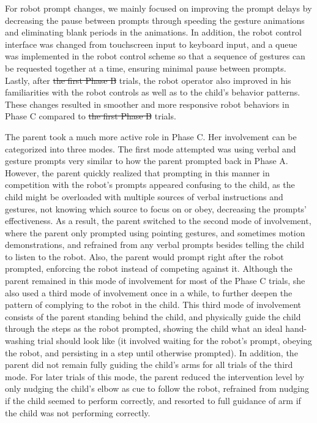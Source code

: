 \documentclass{ut-thesis}
\providecommand{\DIFaddtex}[1]{{\protect\color{blue}\uwave{#1}}} %
\providecommand{\DIFdeltex}[1]{{\protect\color{red}\sout{#1}}}                      %
\providecommand{\DIFaddbegin}{} %
\providecommand{\DIFaddend}{} %
\providecommand{\DIFdelbegin}{} %
\providecommand{\DIFdelend}{} %
\providecommand{\DIFadd}[1]{\texorpdfstring{\DIFaddtex{#1}}{#1}} %
\providecommand{\DIFdel}[1]{\texorpdfstring{\DIFdeltex{#1}}{}} %
\begin{document}
For robot prompt changes, we mainly focused on improving the prompt delays by decreasing the pause between prompts through speeding the gesture animations and eliminating blank periods in the animations.  In addition, the robot control interface was changed from touchscreen input to keyboard input, and a queue was implemented in the robot control scheme so that a sequence of gestures can be requested together at a time, ensuring minimal pause between prompts.  Lastly, after \DIFdelbegin \DIFdel{the first Phase B }\DIFdelend \DIFaddbegin \DIFadd{Phase B1 }\DIFaddend trials, the robot operator also improved in his familiarities with the robot controls as well as to the child's behavior patterns.  These changes resulted in smoother and more responsive robot behaviors in Phase C compared to \DIFdelbegin \DIFdel{the first Phase B }\DIFdelend \DIFaddbegin \DIFadd{Phase B1 }\DIFaddend trials.

The parent took a much more active role in Phase C.  Her involvement can be categorized into three modes.  The first mode attempted was using verbal and gesture prompts very similar to how the parent prompted back in Phase A.  However, the parent quickly realized that prompting in this manner in competition with the robot's prompts appeared confusing to the child, as the child might be overloaded with multiple sources of verbal instructions and gestures, not knowing which source to focus on or obey, decreasing the prompts' effectiveness.  As a result, the parent switched to the second mode of involvement, where the parent only prompted using pointing gestures, and sometimes motion demonstrations, and refrained from any verbal prompts besides telling the child to listen to the robot.  Also, the parent would prompt right after the robot prompted, enforcing the robot instead of competing against it.  Although the parent remained in this mode of involvement for most of the Phase C trials, she also used a third mode of involvement once in a while, to further deepen the pattern of complying to the robot in the child.  This third mode of involvement consists of the parent standing behind the child, and physically guide the child through the steps as the robot prompted, showing the child what an ideal hand-washing trial should look like (it involved waiting for the robot's prompt, obeying the robot, and persisting in a step until otherwise prompted).  In addition, the parent did not remain fully guiding the child's arms for all trials of the third mode.  For later trials of this mode, the parent reduced the intervention level by only nudging the child's elbow as cue to follow the robot, refrained from nudging if the child seemed to perform correctly, and resorted to full guidance of arm if the child was not performing correctly.
\end{document}
